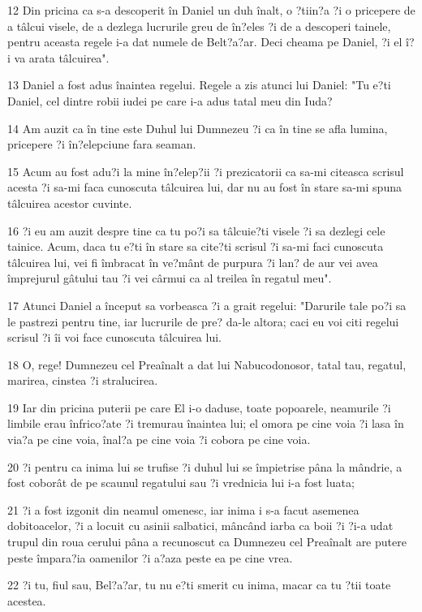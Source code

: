 \par 12 Din pricina ca s-a descoperit în Daniel un duh înalt, o ?tiin?a ?i o pricepere de a tâlcui visele, de a dezlega lucrurile greu de în?eles ?i de a descoperi tainele, pentru aceasta regele i-a dat numele de Belt?a?ar. Deci cheama pe Daniel, ?i el î?i va arata tâlcuirea".
\par 13 Daniel a fost adus înaintea regelui. Regele a zis atunci lui Daniel: "Tu e?ti Daniel, cel dintre robii iudei pe care i-a adus tatal meu din Iuda?
\par 14 Am auzit ca în tine este Duhul lui Dumnezeu ?i ca în tine se afla lumina, pricepere ?i în?elepciune fara seaman.
\par 15 Acum au fost adu?i la mine în?elep?ii ?i prezicatorii ca sa-mi citeasca scrisul acesta ?i sa-mi faca cunoscuta tâlcuirea lui, dar nu au fost în stare sa-mi spuna tâlcuirea acestor cuvinte.
\par 16 ?i eu am auzit despre tine ca tu po?i sa tâlcuie?ti visele ?i sa dezlegi cele tainice. Acum, daca tu e?ti în stare sa cite?ti scrisul ?i sa-mi faci cunoscuta tâlcuirea lui, vei fi îmbracat în ve?mânt de purpura ?i lan? de aur vei avea împrejurul gâtului tau ?i vei cârmui ca al treilea în regatul meu".
\par 17 Atunci Daniel a început sa vorbeasca ?i a grait regelui: "Darurile tale po?i sa le pastrezi pentru tine, iar lucrurile de pre? da-le altora; caci eu voi citi regelui scrisul ?i îi voi face cunoscuta tâlcuirea lui.
\par 18 O, rege! Dumnezeu cel Preaînalt a dat lui Nabucodonosor, tatal tau, regatul, marirea, cinstea ?i stralucirea.
\par 19 Iar din pricina puterii pe care El i-o daduse, toate popoarele, neamurile ?i limbile erau înfrico?ate ?i tremurau înaintea lui; el omora pe cine voia ?i lasa în via?a pe cine voia, înal?a pe cine voia ?i cobora pe cine voia.
\par 20 ?i pentru ca inima lui se trufise ?i duhul lui se împietrise pâna la mândrie, a fost coborât de pe scaunul regatului sau ?i vrednicia lui i-a fost luata;
\par 21 ?i a fost izgonit din neamul omenesc, iar inima i s-a facut asemenea dobitoacelor, ?i a locuit cu asinii salbatici, mâncând iarba ca boii ?i ?i-a udat trupul din roua cerului pâna a recunoscut ca Dumnezeu cel Preaînalt are putere peste împara?ia oamenilor ?i a?aza peste ea pe cine vrea.
\par 22 ?i tu, fiul sau, Bel?a?ar, tu nu e?ti smerit cu inima, macar ca tu ?tii toate acestea.
